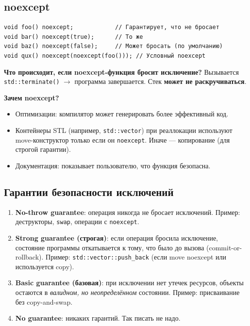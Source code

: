 \documentclass[12pt,a4paper]{article}
\begin{document}
\subsection{noexcept}

\begin{lstlisting}
void foo() noexcept;            // Гарантирует, что не бросает
void bar() noexcept(true);      // То же
void baz() noexcept(false);     // Может бросать (по умолчанию)
void qux() noexcept(noexcept(foo())); // Условный noexcept
\end{lstlisting}

\textbf{Что происходит, если noexcept-функция бросит исключение?} Вызывается \texttt{std::terminate()} $\to$ программа завершается. Стек \textbf{может не раскручиваться}.

\textbf{Зачем noexcept?}
\begin{itemize}
    \item Оптимизации: компилятор может генерировать более эффективный код.
    \item Контейнеры STL (например, \texttt{std::vector}) при реаллокации используют move-конструктор только если он \texttt{noexcept}. Иначе --- копирование (для строгой гарантии).
    \item Документация: показывает пользователю, что функция безопасна.
\end{itemize}

\subsection{Гарантии безопасности исключений}

\begin{enumerate}
    \item \textbf{No-throw guarantee}: операция никогда не бросает исключений. Пример: деструкторы, \texttt{swap}, операции с \texttt{noexcept}.

    \item \textbf{Strong guarantee (строгая)}: если операция бросила исключение, состояние программы откатывается к тому, что было до вызова (commit-or-rollback). Пример: \texttt{std::vector::push\_back} (если move noexcept или используется copy).

    \item \textbf{Basic guarantee (базовая)}: при исключении нет утечек ресурсов, объекты остаются в \textit{валидном, но неопределённом} состоянии. Пример: присваивание без copy-and-swap.

    \item \textbf{No guarantee}: никаких гарантий. Так писать не надо.
\end{enumerate}
\end{document}
